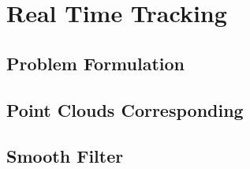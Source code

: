 \chapter{Real Time Tracking}
\label{c:tracking}

\section{Problem Formulation}

\section{Point Clouds Corresponding}

\section{Smooth Filter}